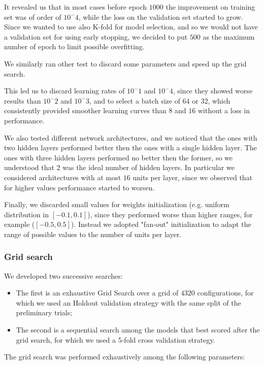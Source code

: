 It revealed us that in most cases before epoch $1000$ the improvement on training set was of order of $10^-4$, while the loss on the validation set started to grow. Since we wanted to use also K-fold for model selection, and so we would not have a validation set for using early stopping, we decided to put $500$ as the maximum number of epoch to limit possible overfitting.

We similarly ran other test to discard some parameters and speed up the grid search. 

This led us to discard learning rates of $10^-1$ and $10^-4$, since they showed worse results than $10^-2$ and $10^-3$, and to select a batch size of $64$ or $32$, which consistently provided smoother learning curves than $8$ and $16$ without a loss in performance. 

We also tested different network architectures, and we noticed that the ones with two hidden layers performed better then the ones with a single hidden layer. The ones with three hidden layers performed no better then the former, so we understood that 2 was the ideal number of hidden layers.
In particular we considered architectures with at most $16$ units per layer, since we observed that for higher values performance started to worsen.


Finally, we discarded small values for weights initialization (e.g. uniform distribution in $[-0.1, 0.1]$), since they performed worse than higher ranges, for example ($[-0.5, 0.5]$).
Instead we adopted "fan-out" initialization to adapt the range of possible values to the number of units per layer.

\subsubsection{Grid search}

We developed two successive searches:
\begin{itemize}
    \item The first is an exhaustive Grid Search over a grid of $4320$ configurations, for which we used an Holdout validation strategy with the same split of the preliminary trials;
    
    \item The second is a sequential search among the models that best scored after the grid search, for which we used a 5-fold cross validation strategy.
\end{itemize}

The grid search was performed exhaustively among the following parameters:

